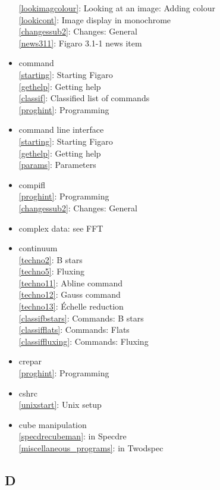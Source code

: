 \documentclass[11pt,twoside]{article}
\newcommand{\htmlref}[2]{#1}
\newcommand{\idxint}[2]{\ref{#1}: \htmlref{#2}{#1}}
\newcommand{\idxint}[2]{\htmlref{#2}{#1}}
\begin{document}
\begin{itemize}
   \idxint{lookimagcolour}{Looking at an image: Adding colour}\\
   \idxint{lookicont}{Image display in monochrome}\\
   \idxint{changessub2}{Changes: General}\\
   \idxint{news311}{Figaro 3.1-1 news item}
\item command\\
   \idxint{starting}{Starting Figaro}\\
   \idxint{gethelp}{Getting help}\\
   \idxint{classif}{Classified list of commands}\\
   \idxint{proghint}{Programming}
\item command line interface\\
   \idxint{starting}{Starting Figaro}\\
   \idxint{gethelp}{Getting help}\\
   \idxint{params}{Parameters}
\item compifl\\
   \idxint{proghint}{Programming}\\
   \idxint{changessub2}{Changes: General}
\item complex data: see FFT
\item continuum\\
   \idxint{techno2}{B stars}\\
   \idxint{techno5}{Fluxing}\\
   \idxint{techno11}{Abline command}\\
   \idxint{techno12}{Gauss command}\\
   \idxint{techno13}{\'Echelle reduction}\\
   \idxint{classifbstars}{Commands: B stars}\\
   \idxint{classifflats}{Commands: Flats}\\
   \idxint{classiffluxing}{Commands: Fluxing}
\item crepar\\
   \idxint{proghint}{Programming}
\item cshrc\\
   \idxint{unixstart}{Unix setup}
\item cube manipulation\\
   \idxint{specdrecubeman}{in Specdre}\\
   \idxint{miscellaneous_programs}{in Twodspec}
\end{itemize}

\subsection*{\label{index_D}D}
\end{document}
